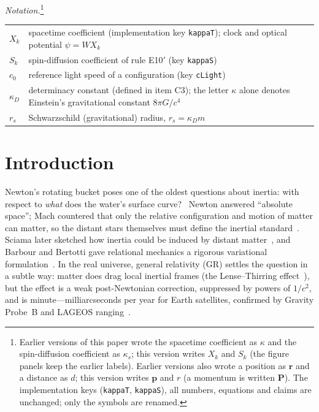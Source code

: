 \documentclass[aps,reprint,amsmath,amssymb,nofootinbib,superscriptaddress,floatfix]{revtex4-2}
\newcommand{\vect}[1]{\bm{#1}}
\begin{document}
\noindent\textit{Notation.}\footnote{Earlier versions of this paper wrote the spacetime coefficient as $\kappa$ and the spin-diffusion coefficient as $\kappa_s$; this version writes $X_k$ and $S_k$ (the figure panels keep the earlier labels). Earlier versions also wrote a position as $\vect{r}$ and a distance as $d$; this version writes $\vect{p}$ and $r$ (a momentum is written $\vect{P}$). The implementation keys (\texttt{kappaT}, \texttt{kappaS}), all numbers, equations and claims are unchanged; only the symbols are renamed.}
\begin{center}
\small
\begin{tabular}{@{}lp{}@{}}
\hline
$X_k$ & spacetime coefficient (implementation key \texttt{kappaT}); clock and optical potential $\psi = W X_k$ \\
$S_k$ & spin-diffusion coefficient of rule E10$'$ (key \texttt{kappaS}) \\
$c_0$ & reference light speed of a configuration (key \texttt{cLight}) \\
$\kappa_D$ & determinacy constant (defined in item C3); the letter $\kappa$ alone denotes Einstein's gravitational constant $8\pi G/c^4$ \\
$r_s$ & Schwarzschild (gravitational) radius, $r_s = \kappa_D m$ \\
\hline
\end{tabular}
\end{center}

\section{Introduction}
\label{sec:intro}

Newton's rotating bucket poses one of the oldest questions about
inertia: with
respect to \emph{what} does the water's surface curve?~\cite{Newton1687}
Newton answered ``absolute space''; Mach countered that only the
relative configuration and motion of matter can matter, so the distant
stars themselves must define the inertial standard~\cite{Mach1883}.
Sciama later sketched how inertia could be induced by distant
matter~\cite{Sciama1953}, and Barbour and Bertotti gave relational
mechanics a rigorous variational formulation~\cite{BarbourBertotti1982}.
In the real universe, general relativity (GR) settles the question in a
subtle way: matter does drag local inertial frames (the Lense--Thirring
effect~\cite{LenseThirring1918}), but the effect is a weak
post-Newtonian correction, suppressed by powers of $1/c^2$, and is
minute---milliarcseconds per year for Earth
satellites, confirmed by Gravity Probe~B and LAGEOS
ranging~\cite{Everitt2011,CiufoliniPavlis2004}.
\end{document}

